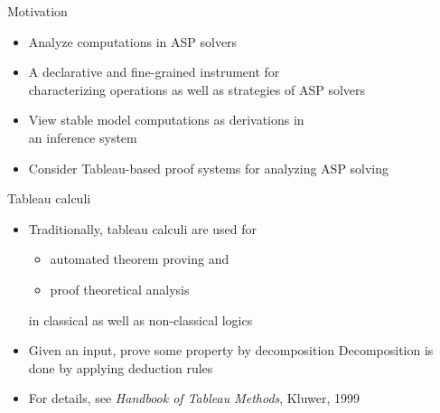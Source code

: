 \begin{frame}{Motivation}
  \bigskip
  \begin{itemize}
  \item<1->  Analyze computations in ASP solvers
    \smallskip
  \item<1-> 
    A declarative and fine-grained instrument for \\ characterizing
    operations as well as strategies of ASP solvers
    \bigskip
  \item<2-> 
    View stable model computations as derivations in\\ an inference system
  \item<3-> [] Consider \alert{Tableau-based proof systems} for analyzing ASP solving
\end{itemize}
\end{frame}
\begin{frame}{Tableau calculi}
  \bigskip
  \begin{itemize}
  \item Traditionally, tableau calculi are used for
    \begin{itemize}
    \item automated theorem proving and
    \item proof theoretical analysis
    \end{itemize}
    in classical as well as non-classical logics
    \medskip
  \item {}
    Given an input, prove some property by decomposition
    Decomposition is done by applying deduction rules
  \item For details, see \emph{Handbook of Tableau Methods}, Kluwer, 1999 \cite{TableauHandbook}
  \end{itemize}
\end{frame}
